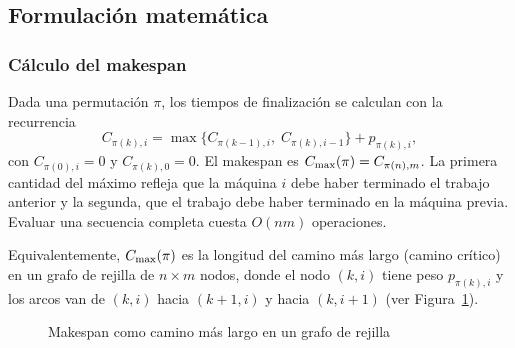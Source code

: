 \subsection{Formulación matemática}

\subsubsection{Cálculo del makespan}

Dada una permutación $\pi$, los tiempos de finalización se calculan con la
recurrencia
\begin{equation}\label{eq:rec}
C_{\pi(k),i} = \max\bigl\{C_{\pi(k-1),i},\; C_{\pi(k),i-1}\bigr\} + p_{\pi(k),i},
\end{equation}
con $C_{\pi(0),i}=0$ y $C_{\pi(k),0}=0$. El makespan es $C_{\max}(\pi)=C_{\pi(n),m}$. La
primera cantidad del máximo refleja que la máquina $i$ debe haber terminado el trabajo
anterior y la segunda, que el trabajo debe haber terminado en la máquina previa. Evaluar
una secuencia completa cuesta $O(nm)$ operaciones.

Equivalentemente, $C_{\max}(\pi)$ es la longitud del camino más largo (camino crítico)
en un grafo de rejilla de $n\times m$ nodos, donde el nodo $(k,i)$ tiene peso
$p_{\pi(k),i}$ y los arcos van de $(k,i)$ hacia $(k+1,i)$ y hacia $(k,i+1)$
(ver Figura~\ref{fig:grafo}).

\begin{figure}[htbp]
\caption{Makespan como camino más largo en un grafo de rejilla}\label{fig:grafo}
\centering
\end{figure}

